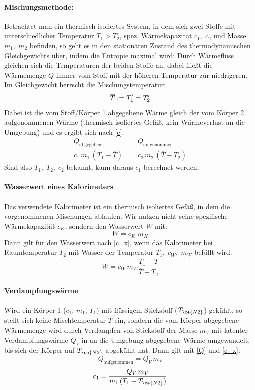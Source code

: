 \paragraph{Mischungsmethode:}
Betrachtet man ein thermisch isoliertes System, in dem sich zwei Stoffe mit unterschiedlicher Temperatur \(T_1 > T_2\), spez. Wärmekapazität \(c_1,\;c_2\) und Masse \(m_1,\;m_2\) befinden, so geht es in den stationären Zustand des thermodynamischen Gleichgewichts über, indem die Entropie maximal wird: Durch Wärmefluss gleichen sich die Temperaturen der beiden Stoffe an, dabei fließt die Wärmemenge \(Q\) immer vom Stoff mit der höheren Temperatur zur niedrigeren. Im Gleichgewicht herrscht die Mischungstemperatur:
\[\overline{T} \vcentcolon= T_1'=T_2'\]
Dabei ist die vom Stoff/Körper 1 abgegebene Wärme gleich der vom Körper 2 aufgenommenen Wärme (thermisch isoliertes Gefäß, kein Wärmeverlust an die Umgebung) und es ergibt sich nach \cref{c}:
\begin{align}
    Q_{\text{abgegeben}}=&Q_{\text{aufgenommen}}\label{Q}\\
    c_1\,m_1\,(T_1-\overline{T})=&c_2\,m_2\,(\overline{T}-T_2)
    \label{c_x}
\end{align}
Sind also \(T_1,\;T_2,\;c_2\) bekannt, kann daraus \(c_1\) berechnet werden.

\paragraph{Wasserwert eines Kalorimeters}
Das verwendete Kalorimeter ist ein thermisch isoliertes Gefäß, in dem die vorgenommenen Mischungen ablaufen. Wir nutzen nicht seine spezifische Wärmekapazität \(c_K\), sondern den Wasserwert \(W\) mit:
\begin{equation}
    W=c_K\;m_K
\end{equation} 
Dann gilt für den Wasserwert nach \cref{c_x}, wenn das Kalorimeter bei Raumtemperatur \(T_2\) mit Wasser der Temperatur \(T_1,\;c_W,\;m_W\) befüllt wird:
\begin{equation}
    W=c_W\,m_W\dfrac{T_1-\overline{T}}{\overline{T}-T_2}
    \label{eq:Wasserwert}
\end{equation}

\paragraph{Verdampfungswärme}
Wird ein Körper 1 (\(c_1,\,m_1,\,T_1\)) mit flüssigem Stickstoff (\(T_{\ce{N2}}\)) gekühlt, so stellt sich keine Mischtemperatur \(\overline{T}\) ein, sondern die vom Körper abgegebene Wärmemenge wird durch Verdampfen von Stickstoff der Masse \(m_V\) mit latenter Verdampfungswärme \(Q_V\) in an die Umgebung abgegebene Wärme umgewandelt, bis sich der Körper auf \(T_{\ce{N2}}\) abgekühlt hat. Dann gilt mit \cref{Q} und \cref{c_x}:
\begin{equation}
    Q_{\text{aufgenommen}}=Q_V\,m_V
\end{equation}
\begin{equation}
    c_1=\dfrac{Q_V\,m_V}{m_1\,(T_1-T_{\ce{N2}})}
    \label{c_x_Stickstoff}
\end{equation}

